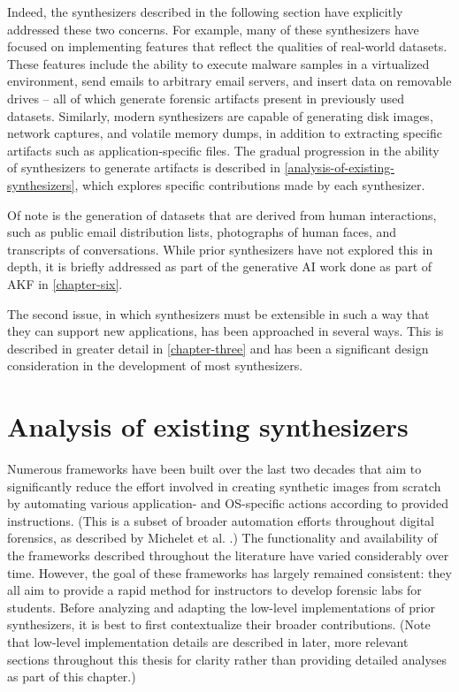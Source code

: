\documentclass[letterpaper,12pt]{report}
\begin{document}
Indeed, the synthesizers described in the following section have
explicitly addressed these two concerns. For example, many of these
synthesizers have focused on implementing features that reflect the
qualities of real-world datasets. These features include the ability to
execute malware samples in a virtualized environment, send emails to
arbitrary email servers, and insert data on removable drives -- all of
which generate forensic artifacts present in previously used datasets.
Similarly, modern synthesizers are capable of generating disk images,
network captures, and volatile memory dumps, in addition to extracting
specific artifacts such as application-specific files. The gradual
progression in the ability of synthesizers to generate artifacts is
described in \autoref{analysis-of-existing-synthesizers}, which explores specific contributions made by
each synthesizer.

Of note is the generation of datasets that are derived from human
interactions, such as public email distribution lists, photographs of
human faces, and transcripts of conversations. While prior synthesizers
have not explored this in depth, it is briefly addressed as part of the
generative AI work done as part of AKF in \autoref{chapter-six}.

The second issue, in which synthesizers must be extensible in such a way
that they can support new applications, has been approached in several
ways. This is described in greater detail in \autoref{chapter-three} and has been a significant design consideration in the
development of most synthesizers.

\section{Analysis of existing
synthesizers}\label{analysis-of-existing-synthesizers}

Numerous frameworks have been built over the last two decades that aim
to significantly reduce the effort involved in creating synthetic images
from scratch by automating various application- and OS-specific actions
according to provided instructions. (This is a subset of broader
automation efforts throughout digital forensics, as described by
Michelet et al. \cite{micheletAutomationDigitalForensics2023}.) The
functionality and availability of the frameworks described throughout
the literature have varied considerably over time. However, the goal of
these frameworks has largely remained consistent: they all aim to
provide a rapid method for instructors to develop forensic labs for
students. Before analyzing and adapting the low-level implementations of
prior synthesizers, it is best to first contextualize their broader
contributions. (Note that low-level implementation details are described
in later, more relevant sections throughout this thesis for clarity
rather than providing detailed analyses as part of this chapter.)
\end{document}
